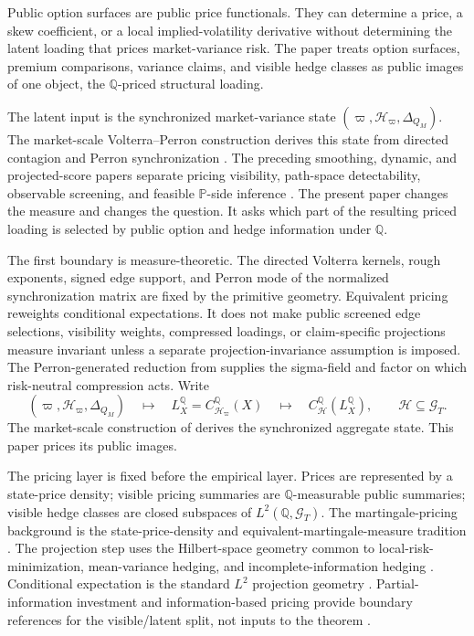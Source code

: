 \documentclass[11pt,a4paper]{amsart}
\theoremstyle{plain}
\theoremstyle{definition}
\theoremstyle{remark}
\newcommand{\PP}{\mathbb{P}}
\newcommand{\QQ}{\mathbb{Q}}
\newcommand{\cG}{\mathcal{G}}
\newcommand{\cH}{\mathcal{H}}
\begin{document}
Public option surfaces are public price functionals.  They can determine a price, a skew
coefficient, or a local implied-volatility derivative without determining the latent loading that
prices market-variance risk.  The paper treats option surfaces, premium comparisons, variance
claims, and visible hedge classes as public images of one object, the \(\QQ\)-priced structural
loading.

The latent input is the synchronized market-variance state
\((\varpi,\cH_\varpi,\Delta_{Q_M})\).  The market-scale Volterra--Perron construction derives this
state from directed contagion and Perron synchronization \cite{vidal2026market}.  The preceding
smoothing, dynamic, and projected-score papers separate pricing visibility, path-space
detectability, observable screening, and feasible \(\PP\)-side inference
\cite{vidal2026latent,vidal2026dynamic,vidal2026econometric}.  The present paper changes the
measure and changes the question.  It asks which part of the resulting priced loading is selected
by public option and hedge information under \(\QQ\).

The first boundary is measure-theoretic.  The directed Volterra kernels, rough exponents, signed
edge support, and Perron mode of the normalized synchronization matrix are fixed by the primitive
geometry.  Equivalent pricing reweights conditional expectations.  It does not make public
screened edge selections, visibility weights, compressed loadings, or claim-specific projections
measure invariant unless a separate projection-invariance assumption is imposed.  The
Perron-generated reduction from \cite{vidal2026market} supplies the sigma-field and factor on which
risk-neutral compression acts.  Write
\[
        (\varpi,\cH_\varpi,\Delta_{Q_M})
        \quad\longmapsto\quad
        L_X^\QQ=C_{\cH_\varpi}^{\QQ}(X)
        \quad\longmapsto\quad
        C_{\cH}^{\QQ}(L_X^\QQ),
        \qquad
        \cH\subseteq\cG_T.
\]
The market-scale construction of \cite{vidal2026market} derives the synchronized aggregate state.
This paper prices its public images.

The pricing layer is fixed before the empirical layer.  Prices are represented by a
state-price density; visible pricing summaries are \(\QQ\)-measurable public summaries; visible
hedge classes are closed subspaces of \(L^2(\QQ,\cG_T)\).  The martingale-pricing background is the
state-price-density and equivalent-martingale-measure tradition
\cite{harrisonKreps1979,harrisonPliska1981,merton1973,delbaen1994,karatzasShreve1998}.  The
projection step uses the Hilbert-space geometry common to local-risk-minimization,
mean-variance hedging, and incomplete-information hedging
\cite{follmerSondermann1986,follmerSchweizer1991,schweizer1992meanVariance,
schweizer1995minimal,choulliVandaeleVanmaele2010}.  Conditional expectation is the standard
\(L^2\) projection geometry \cite{williams1991,karatzasShreve1991}.  Partial-information
investment and information-based pricing provide boundary references for the visible/latent split,
not inputs to the theorem \cite{lakner1995partial,brodyHughstonMacrina2008}.
\end{document}

